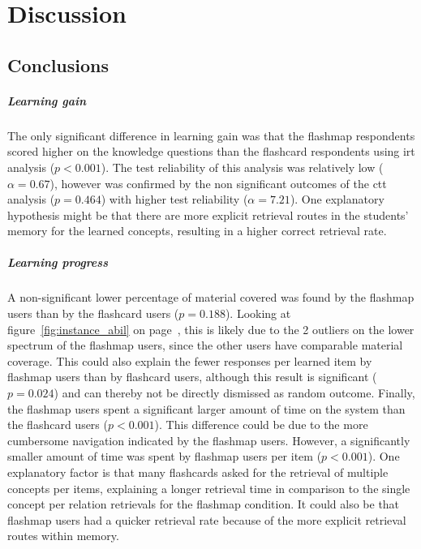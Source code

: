 \chapter{Discussion}
\label{ch:discussion}

\section{Conclusions}

\paragraph{Learning gain} The only significant difference in learning gain was that the flashmap respondents scored higher on the knowledge questions than the flashcard respondents using irt analysis ($p < 0.001$). The test reliability of this analysis was relatively low ($\alpha=0.67$), however was confirmed by the non significant outcomes of the ctt analysis ($p=0.464$) with higher test reliability ($\alpha=7.21$). One explanatory hypothesis might be that there are more explicit retrieval routes in the students' memory for the learned concepts, resulting in a higher correct retrieval rate.

\paragraph{Learning progress} A non-significant lower percentage of material covered was found by the flashmap users than by the flashcard users ($p=0.188$). Looking at figure~\ref{fig:instance_abil} on page~\pageref{fig:instance_abil}, this is likely due to the 2 outliers on the lower spectrum of the flashmap users, since the other users have comparable material coverage. This could also explain the fewer responses per learned item by flashmap users than by flashcard users, although this result is significant ($p=0.024$) and can thereby not be directly dismissed as random outcome. Finally, the flashmap users spent a significant larger amount of time on the system than the flashcard users ($p<0.001$). This difference could be due to the more cumbersome navigation indicated by the flashmap users. However, a significantly smaller amount of time was spent by flashmap users per item ($p<0.001$). One explanatory factor is that many flashcards asked for the retrieval of multiple concepts per items, explaining a longer retrieval time in comparison to the single concept per relation retrievals for the flashmap condition. It could also be that flashmap users had a quicker retrieval rate because of the more explicit retrieval routes within memory.

